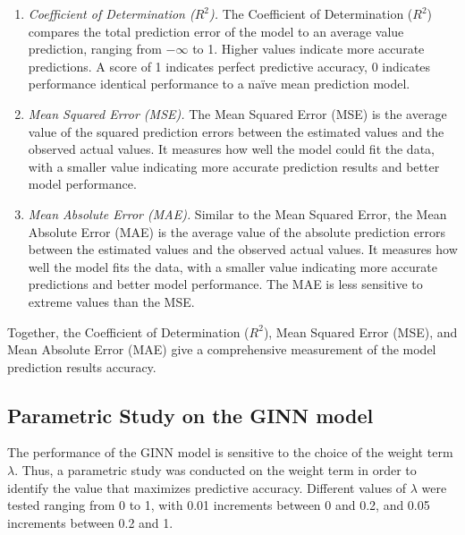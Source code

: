 \begin{enumerate}
\item \textit{Coefficient of Determination ($R^2$).} The Coefficient of Determination ($R^2$) compares the total prediction error of the model to an average value prediction, ranging from $-\infty$ to 1. Higher values indicate more accurate predictions.  A score of 1 indicates perfect predictive accuracy, 0 indicates performance identical performance to a naïve mean prediction model. 

\item \textit{Mean Squared Error (MSE).} The Mean Squared Error (MSE) is the average value of the squared prediction errors between the estimated values and the observed actual values. It measures how well the model could fit the data, with a smaller value indicating more accurate prediction results and better model performance. 

\item \textit{Mean Absolute Error (MAE).} Similar to the Mean Squared Error, the Mean Absolute Error (MAE) is the average value of the absolute prediction errors between the estimated values and the observed actual values. It measures how well the model fits the data, with a smaller value indicating more accurate predictions and better model performance. The MAE is less sensitive to extreme values than the MSE. 
\end{enumerate}

Together, the Coefficient of Determination ($R^2$), Mean Squared Error (MSE), and Mean Absolute Error (MAE) give a comprehensive measurement of the model prediction results accuracy.

\subsection{Parametric Study on the GINN model}
The performance of the GINN model is sensitive to the choice of the weight term $\lambda$. Thus, a parametric study was conducted on the weight term in order to identify the value that maximizes predictive accuracy. Different values of $\lambda$ were tested ranging from 0 to 1, with 0.01 increments between 0 and 0.2, and 0.05 increments between 0.2 and 1. 

